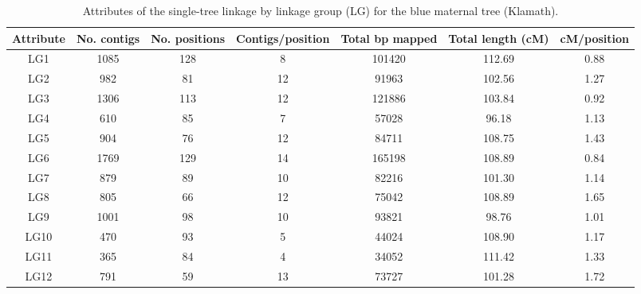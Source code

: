 \documentclass[smallextended]{svjour3}
\begin{document}
\clearpage
\begin{landscape}
\begin{table}[ht]
  \caption{Attributes of the single-tree linkage by linkage group (LG) for the blue maternal tree (Klamath).} 
\begin{tabular}{ccccccc}
\toprule
Attribute & No. contigs & No. positions & Contigs/position & Total bp mapped & Total length (cM) & cM/position \\
\midrule
LG1 & 1085 & 128 & 8 & 101420 & 112.69 & 0.88 \\
LG2 & 982 & 81 & 12 & 91963 & 102.56 & 1.27 \\
LG3 & 1306 & 113 & 12 & 121886 & 103.84 & 0.92 \\
LG4 & 610 & 85 & 7 & 57028 & 96.18 & 1.13 \\
LG5 & 904 & 76 & 12 & 84711 & 108.75 & 1.43 \\
LG6 & 1769 & 129 & 14 & 165198 & 108.89 & 0.84 \\
LG7 & 879 & 89 & 10 & 82216 & 101.30 & 1.14 \\
LG8 & 805 & 66 & 12 & 75042 & 108.89 & 1.65 \\
LG9 & 1001 & 98 & 10 & 93821 & 98.76 & 1.01 \\
LG10 & 470 & 93 & 5 & 44024 & 108.90 & 1.17 \\
LG11 & 365 & 84 & 4 & 34052 & 111.42 & 1.33 \\
LG12 & 791 & 59 & 13 & 73727 & 101.28 & 1.72 \\
\bottomrule
\end{tabular}
\label{t:label}
\end{table}
\end{landscape}
\end{document}
